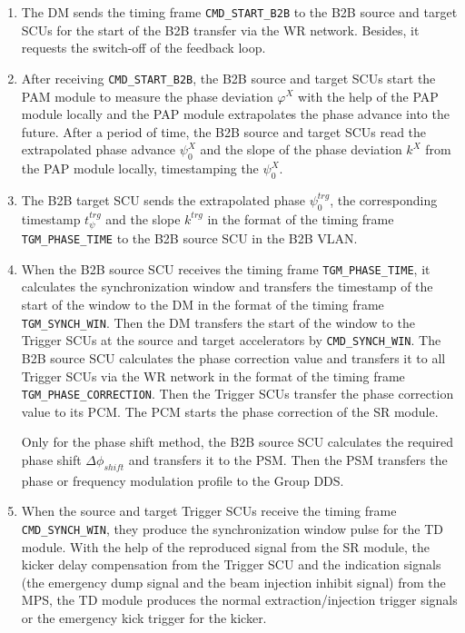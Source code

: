 \begin{enumerate}
\item The DM sends the timing frame \verb|CMD_START_B2B| to the B2B source and target SCUs for the start of the B2B transfer via the WR network. Besides, it requests the switch-off of the feedback loop.

\item  After receiving \verb|CMD_START_B2B|, the B2B source and target SCUs start the PAM module to measure the phase deviation $\varphi^X$ with the help of the PAP module locally and the PAP module extrapolates the phase advance into the future. After a period of time, the B2B source and target SCUs read the extrapolated phase advance $\psi^X_0$ and the slope of the phase deviation $k^\mathit{X}$ from the PAP module locally, timestamping the $\psi^X_0$.  

\item  The B2B target SCU sends the extrapolated phase $\psi^\mathit{trg}_0$, the corresponding timestamp $t_\psi^\mathit{trg}$ and the slope $k^\mathit{trg}$ in the format of the timing frame \verb|TGM_PHASE_TIME| to the B2B source SCU in the B2B VLAN. 

\item  When the B2B source SCU receives the timing frame \verb|TGM_PHASE_TIME|, it calculates the synchronization window and transfers the timestamp of the start of the window to the DM in the format of the timing frame \verb|TGM_SYNCH_WIN|. Then the DM transfers the start of the window to the Trigger SCUs at the source and target accelerators by \verb|CMD_SYNCH_WIN|.
The B2B source SCU calculates the phase correction value and transfers it to all Trigger SCUs via the WR network in the format of the timing frame \verb|TGM_PHASE_CORRECTION|. Then the Trigger SCUs transfer the phase correction value to its \gls{PCM}. The PCM starts the phase correction of the SR module. 

Only for the phase shift method, the B2B source SCU calculates the required phase shift $\Delta \phi_\mathit{shift}$ and transfers it to the PSM. Then the PSM transfers the phase or frequency modulation profile to the Group DDS.  

\item  When the source and target Trigger SCUs receive the timing frame \verb|CMD_SYNCH_WIN|, they produce the synchronization window pulse for the TD module. With the help of the reproduced signal from the SR module, the kicker delay compensation from the Trigger SCU and the indication signals (the emergency dump signal and the beam injection inhibit signal) from the MPS, the TD module produces the normal extraction/injection trigger signals or the emergency kick trigger for the kicker.  


\end{enumerate}
